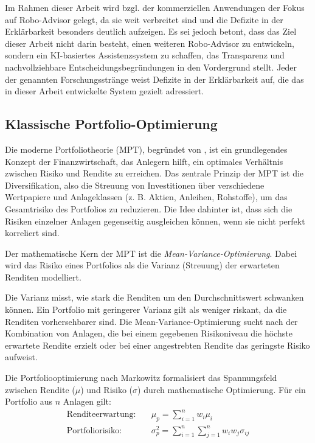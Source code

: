   Im Rahmen dieser Arbeit wird bzgl. der kommerziellen Anwendungen der Fokus auf Robo-Advisor gelegt, da sie weit verbreitet sind und die Defizite in der Erklärbarkeit besonders deutlich aufzeigen.
  Es sei jedoch betont, dass das Ziel dieser Arbeit nicht darin besteht, einen weiteren Robo-Advisor zu entwickeln, sondern ein \acs{KI}-basiertes Assistenzsystem zu schaffen, das Transparenz und nachvollziehbare Entscheidungsbegründungen in den Vordergrund stellt.
  Jeder der genannten Forschungsstränge weist Defizite in der Erklärbarkeit auf, die das in dieser Arbeit entwickelte System gezielt adressiert.


  \subsection{Klassische Portfolio-Optimierung}

    Die moderne Portfoliotheorie (\acs{MPT}), begründet von \textcite{markowitz1952}, ist ein grundlegendes Konzept der Finanzwirtschaft, das Anlegern hilft, ein optimales Verhältnis zwischen Risiko und Rendite zu erreichen.
    Das zentrale Prinzip der \acs{MPT} ist die Diversifikation, also die Streuung von Investitionen über verschiedene Wertpapiere und Anlageklassen (z. B. Aktien, Anleihen, Rohstoffe), um das Gesamtrisiko des Portfolios zu reduzieren.
    Die Idee dahinter ist, dass sich die Risiken einzelner Anlagen gegenseitig ausgleichen können, wenn sie nicht perfekt korreliert sind.

    Der mathematische Kern der \acs{MPT} ist die \textit{Mean-Variance-Optimierung}.
    Dabei wird das Risiko eines Portfolios als die Varianz (Streuung) der erwarteten Renditen modelliert.

    Die Varianz misst, wie stark die Renditen um den Durchschnittswert schwanken können.
    Ein Portfolio mit geringerer Varianz gilt als weniger riskant, da die Renditen vorhersehbarer sind.
    Die Mean-Variance-Optimierung sucht nach der Kombination von Anlagen, die bei einem gegebenen Risikoniveau die höchste erwartete Rendite erzielt oder bei einer angestrebten Rendite das geringste Risiko aufweist.

    Die Portfoliooptimierung nach Markowitz \autocite{markowitz1952} formalisiert das Spannungsfeld zwischen Rendite ($\mu$) und Risiko ($\sigma$) durch mathematische Optimierung.
    Für ein Portfolio aus $n$ Anlagen gilt:
    \begin{align}
      \text{Renditeerwartung:} \quad & \mu_p = \sum_{i=1}^n w_i \mu_i \label{eq:return} \\
      \text{Portfoliorisiko:} \quad & \sigma_p^2 = \sum_{i=1}^n \sum_{j=1}^n w_i w_j \sigma_{ij} \label{eq:risk}
    \end{align}

